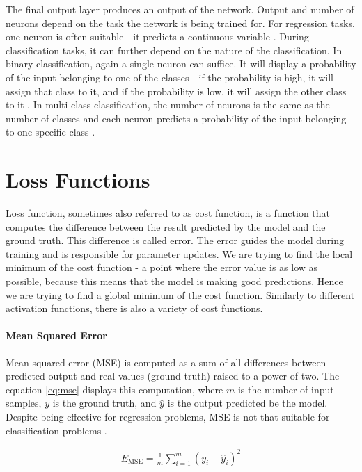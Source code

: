 The final output layer produces an output of the network. Output and number of neurons depend on the task the network is being trained for. For regression tasks, one neuron is often suitable - it predicts a continuous variable \cite{Goodfellow2016}. During classification tasks, it can further depend on the nature of the classification. In binary classification, again a single neuron can suffice. It will display a probability of the input belonging to one of the classes - if the probability is high, it will assign that class to it, and if the probability is low, it will assign the other class to it \cite{Goodfellow2016}. In multi-class classification, the number of neurons is the same as the number of classes and each neuron predicts a probability of the input belonging to one specific class \cite{Goodfellow2016}.

\section{Loss Functions}
Loss function, sometimes also referred to as cost function, is a function that computes the difference between the result predicted by the model and the ground truth. This difference is called error. The error guides the model during training and is responsible for parameter updates. We are trying to find the local minimum of the cost function - a point where the error value is as low as possible, because this means that the model is making good predictions. Hence we are trying to find a global minimum of the cost function. Similarly to different activation functions, there is also a variety of cost functions.

\paragraph{Mean Squared Error}
Mean squared error (MSE) is computed as a sum of all differences between predicted output and real values (ground truth) raised to a power of two. The equation \ref{eq:mse} displays this computation, where $m$ is the number of input samples, $y$ is the ground truth, and $\hat{y}$ is the output predicted be the model. Despite being effective for regression problems, MSE is not that suitable for classification problems \cite{Santosh2022-2}.

\begin{align}
\label{eq:mse}
    E_\text{MSE} = \frac{1}{m}\sum_{i=1}^m(y_i-\hat{y}_i)^2
\end{align}

